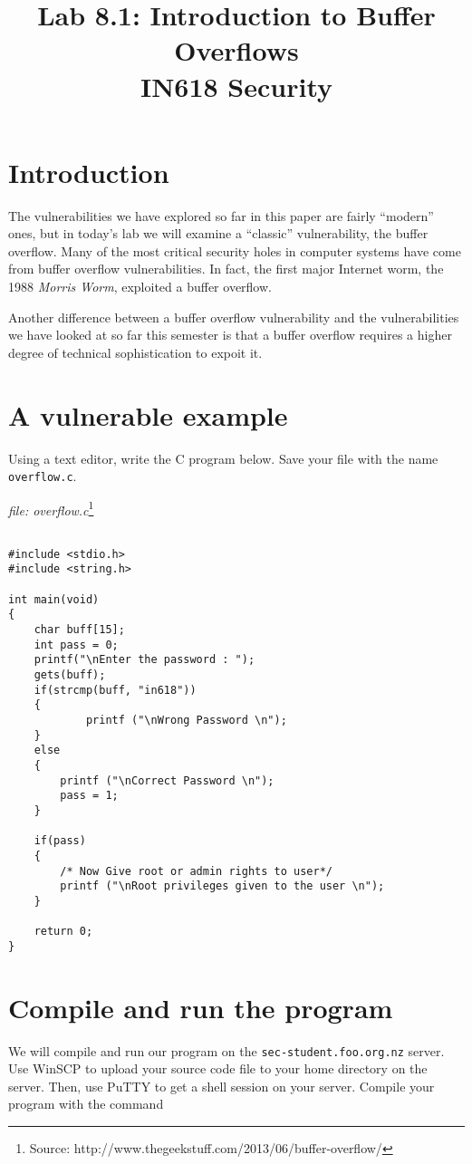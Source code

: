 \documentclass{article}
\begin{document}
\title{ Lab 8.1: Introduction to Buffer Overflows\\ IN618 Security}
\maketitle

\section*{Introduction}
The vulnerabilities we have explored so far in this paper are fairly ``modern'' ones,
but in today's lab we will examine a ``classic'' vulnerability, the buffer overflow. 
Many of the most critical security holes in computer systems have come from buffer
overflow vulnerabilities. In fact, the first major Internet worm, the 1988 \emph{Morris Worm},
exploited a buffer overflow.

Another difference between a buffer overflow vulnerability and the vulnerabilities we have
looked at so far this semester is that a buffer overflow requires a higher degree of technical
sophistication to expoit it.

\section{A vulnerable example}
Using a text editor, write the C program below. Save your file with the name \texttt{overflow.c}.

\emph{file: overflow.c}\footnote{Source: http://www.thegeekstuff.com/2013/06/buffer-overflow/} 
\begin{verbatim}

#include <stdio.h>
#include <string.h>

int main(void)
{
    char buff[15];
    int pass = 0;
    printf("\nEnter the password : ");
    gets(buff);
    if(strcmp(buff, "in618"))
    {
            printf ("\nWrong Password \n");
    }
    else
    {
        printf ("\nCorrect Password \n");
        pass = 1;
    }

    if(pass)
    {
        /* Now Give root or admin rights to user*/
        printf ("\nRoot privileges given to the user \n");
    }

    return 0;
}

\end{verbatim}

\section{Compile and run the program}
We will compile and run our program on the \texttt{sec-student.foo.org.nz} server.  Use  
WinSCP to upload your source code file to your home directory on the server. Then, use 
PuTTY to get a shell session on your server.  Compile your program with the command
\end{document}
